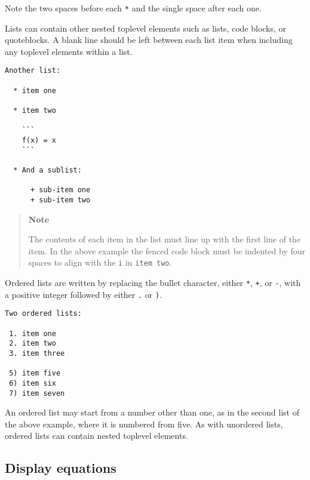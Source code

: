 Note the two spaces before each \texttt{*} and the single space after each one.



Lists can contain other nested toplevel elements such as lists, code blocks, or quoteblocks. A blank line should be left between each list item when including any toplevel elements within a list.




\begin{lstlisting}
Another list:

  * item one

  * item two

    ```
    f(x) = x
    ```

  * And a sublist:

      + sub-item one
      + sub-item two
\end{lstlisting}



\begin{quote}
\textbf{Note}

The contents of each item in the list must line up with the first line of the item. In the above example the fenced code block must be indented by four spaces to align with the \texttt{i} in \texttt{item two}.

\end{quote}


Ordered lists are written by replacing the {\textquotedbl}bullet{\textquotedbl} character, either \texttt{*}, \texttt{+}, or \texttt{-}, with a positive integer followed by either \texttt{.} or \texttt{)}.




\begin{lstlisting}
Two ordered lists:

 1. item one
 2. item two
 3. item three

 5) item five
 6) item six
 7) item seven
\end{lstlisting}



An ordered list may start from a number other than one, as in the second list of the above example, where it is numbered from five. As with unordered lists, ordered lists can contain nested toplevel elements.



\hypertarget{8249559303631128892}{}


\subsection{Display equations}



